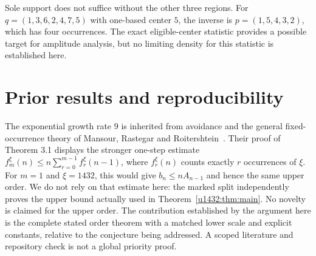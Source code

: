\documentclass[11pt]{article}
\theoremstyle{remark}\newtheorem{remark}[theorem]{Remark}
\begin{document}
Sole support does not suffice without the other three regions. For
$q=(1,3,6,2,4,7,5)$ with one-based center $5$, the inverse is
$p=(1,5,4,3,2)$, which has four occurrences. The exact eligible-center
statistic provides a possible target for amplitude analysis, but no
limiting density for this statistic is established here.

\section{Prior results and reproducibility}\label{u1432:sec:prior}
The exponential growth rate $9$ is inherited from avoidance and the
general fixed-occurrence theory of Mansour, Rastegar and
Roitershtein~\cite{MRR}. Their proof of Theorem 3.1 displays the stronger
one-step estimate $f_m^\xi(n)\le n\sum_{r=0}^{m-1}f_r^\xi(n-1)$,
where $f_r^\xi(n)$ counts exactly $r$ occurrences of $\xi$. For $m=1$
and $\xi=1432$, this would give $b_n\le nA_{n-1}$ and hence the same
upper order. We do not rely on that estimate here: the marked split
independently proves the upper bound actually used in
Theorem~\ref{u1432:thm:main}. No novelty is claimed for the upper order. The contribution established by the argument here
is the complete stated order theorem with a matched lower scale and
explicit constants, relative to the conjecture being addressed.
A scoped literature and repository check is not a global priority proof.
\end{document}

